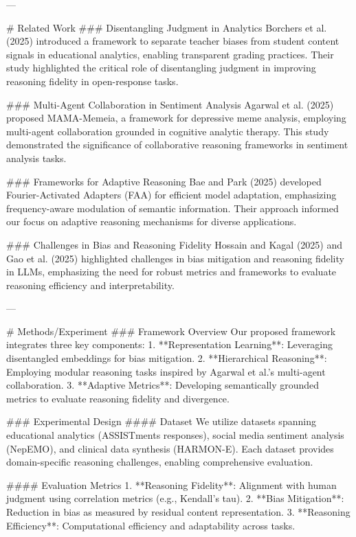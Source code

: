 ---

# Related Work  
### Disentangling Judgment in Analytics  
Borchers et al. (2025) introduced a framework to separate teacher biases from student content signals in educational analytics, enabling transparent grading practices. Their study highlighted the critical role of disentangling judgment in improving reasoning fidelity in open-response tasks.

### Multi-Agent Collaboration in Sentiment Analysis  
Agarwal et al. (2025) proposed MAMA-Memeia, a framework for depressive meme analysis, employing multi-agent collaboration grounded in cognitive analytic therapy. This study demonstrated the significance of collaborative reasoning frameworks in sentiment analysis tasks.

### Frameworks for Adaptive Reasoning  
Bae and Park (2025) developed Fourier-Activated Adapters (FAA) for efficient model adaptation, emphasizing frequency-aware modulation of semantic information. Their approach informed our focus on adaptive reasoning mechanisms for diverse applications.

### Challenges in Bias and Reasoning Fidelity  
Hossain and Kagal (2025) and Gao et al. (2025) highlighted challenges in bias mitigation and reasoning fidelity in LLMs, emphasizing the need for robust metrics and frameworks to evaluate reasoning efficiency and interpretability.

---

# Methods/Experiment  
### Framework Overview  
Our proposed framework integrates three key components:  
1. **Representation Learning**: Leveraging disentangled embeddings for bias mitigation.  
2. **Hierarchical Reasoning**: Employing modular reasoning tasks inspired by Agarwal et al.'s multi-agent collaboration.  
3. **Adaptive Metrics**: Developing semantically grounded metrics to evaluate reasoning fidelity and divergence.

### Experimental Design  
#### Dataset  
We utilize datasets spanning educational analytics (ASSISTments responses), social media sentiment analysis (NepEMO), and clinical data synthesis (HARMON-E). Each dataset provides domain-specific reasoning challenges, enabling comprehensive evaluation.

#### Evaluation Metrics  
1. **Reasoning Fidelity**: Alignment with human judgment using correlation metrics (e.g., Kendall's tau).  
2. **Bias Mitigation**: Reduction in bias as measured by residual content representation.  
3. **Reasoning Efficiency**: Computational efficiency and adaptability across tasks.

